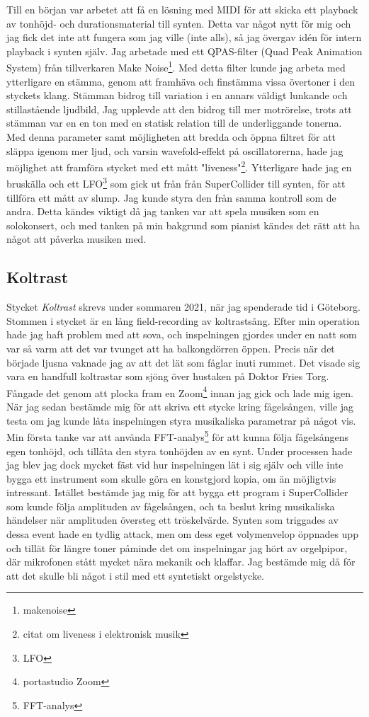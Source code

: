 \documentclass{article}
\begin{document}
		Till en början var arbetet att få en lösning med MIDI för att skicka ett playback av tonhöjd- och
		durationsmaterial till synten. Detta var något nytt för mig och jag fick det inte att fungera som jag
		ville (inte alls), så jag övergav idén för intern playback i synten själv. 
		Jag arbetade med ett QPAS-filter (Quad Peak Animation System) från tillverkaren Make
		Noise\footnote{makenoise}. Med detta filter kunde jag arbeta med ytterligare en stämma, genom att
		framhäva och finstämma vissa övertoner i den styckets klang. Stämman bidrog till variation i en
		annars väldigt lunkande och stillastående ljudbild, Jag upplevde att den bidrog till mer motrörelse,
		trots att stämman var en en ton med en statisk relation till de underliggande tonerna. Med denna
		parameter samt möjligheten att bredda och öppna filtret för att släppa igenom mer ljud, och varsin
		wavefold-effekt på oscillatorerna, hade jag möjlighet att framföra stycket med ett mått
		"liveness"\footnote{citat om liveness i elektronisk musik}. Ytterligare hade jag en bruskälla och ett
		LFO\footnote{LFO} som gick ut från från SuperCollider till synten, för att tillföra ett mått av slump.
		Jag kunde styra den från samma kontroll som de andra. Detta kändes viktigt då jag tanken var att
		spela musiken som en solokonsert, och med tanken på min bakgrund som pianist kändes det rätt att ha
		något att påverka musiken med. 

	\subsection{Koltrast}
	Stycket \emph{Koltrast} skrevs under sommaren 2021, när jag spenderade tid i Göteborg. Stommen i stycket
	är en lång field-recording av koltrastsång. Efter min operation hade jag haft problem med att sova, och
	inspelningen gjordes under en natt som var så varm att det var tvunget att ha balkongdörren öppen. Precis
	när det började ljusna vaknade jag av att det lät som fåglar inuti rummet. Det visade sig vara en handfull
	koltrastar som sjöng över hustaken på Doktor Fries Torg. Fångade det genom att plocka fram en
	Zoom\footnote{portastudio Zoom} innan jag gick och lade mig igen. När jag sedan bestämde mig för att
	skriva ett stycke kring fågelsången, ville jag testa om jag kunde låta inspelningen styra musikaliska
	parametrar på något vis. Min första tanke var att använda FFT-analys\footnote{FFT-analys} för att kunna
	följa fågelsångens egen tonhöjd, och tillåta den styra tonhöjden av en synt. Under processen hade jag blev
	jag dock mycket fäst vid hur inspelningen lät i sig själv och ville inte bygga ett instrument som skulle
	göra en konstgjord kopia, om än möjligtvis intressant. Istället bestämde jag mig för att bygga ett program
	i SuperCollider som kunde följa amplituden av fågelsången, och ta beslut kring musikaliska händelser när
	amplituden översteg ett tröskelvärde. Synten som triggades av dessa event hade en tydlig attack, men om
	dess eget volymenvelop öppnades upp och tillät för längre toner påminde det om inspelningar jag hört av
	orgelpipor, där mikrofonen stått mycket nära mekanik och klaffar. Jag bestämde mig då för att det skulle
	bli något i stil med ett syntetiskt orgelstycke.
\end{document}
